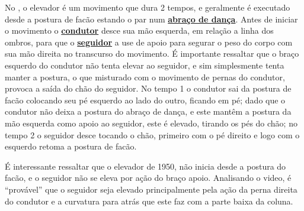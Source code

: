 No \AnoLivro, o elevador é um movimento que dura 2 tempos, e geralmente é
executado desde a postura de facão estando o par num \hyperref[def:abracodedanca]{\textbf{abraço de dança}}.
Antes de iniciar o movimento o \hyperref[def:Condutor]{\textbf{condutor}} 
desce sua mão esquerda, em relação a linha dos ombros, 
para que o \hyperref[def:Seguidor]{\textbf{seguidor}}
a use de apoio para segurar o peso do corpo com sua mão direita no transcurso do movimento.
É importante ressaltar que o braço esquerdo do condutor não tenta elevar ao seguidor, 
e sim simplesmente tenta manter a postura,
o que misturado com o movimento de pernas do condutor,
provoca a saída do chão do seguidor.
No tempo 1 o condutor sai da postura de facão colocando seu pé esquerdo 
ao lado do outro, ficando em pé; dado que o condutor não deixa a postura do abraço de dança,
e este mantêm a postura da mão esquerda  como apoio ao seguidor, este é elevado, tirando os pés do chão;
no tempo 2 o seguidor desce tocando o chão, primeiro com o pé direito e logo com o esquerdo retoma a postura de facão.

É interessante ressaltar que o elevador de 1950, não inicia desde a postura do facão, e 
o seguidor  não se eleva por ação do braço apoio.
Analisando o video, é ``provável'' que o seguidor seja elevado principalmente pela ação da perna direita do condutor
e a curvatura para atrás que este faz com a parte baixa da coluna.


